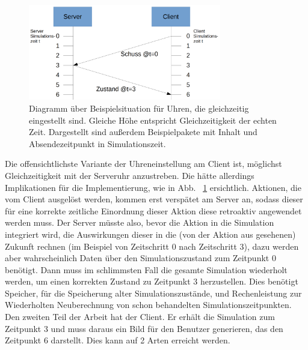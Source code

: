 \begin{figure}
    \centering
    \includegraphics[width=0.75\textwidth]{./Zeichnung1a.png}
    \caption{Diagramm über Beispielsituation für Uhren, die gleichzeitig eingestellt sind. Gleiche Höhe entspricht Gleichzeitigkeit der echten Zeit. Dargestellt sind außerdem Beispielpakete mit Inhalt und Absendezeitpunkt in Simulationszeit.}
    \label{fig:zeichnung1a}
\end{figure}
Die offensichtlichste Variante der Uhreneinstellung am Client ist, möglichst Gleichzeitigkeit mit der Serveruhr anzustreben. Die hätte allerdings Implikationen für die Implementierung, wie in Abb. ~\ref{fig:zeichnung1a} ersichtlich. Aktionen, die vom Client ausgelöst werden, kommen erst verspätet am Server an, sodass dieser für eine korrekte zeitliche Einordnung dieser Aktion diese retroaktiv angewendet werden muss. Der Server müsste also, bevor die Aktion in die Simulation integriert wird, die Auswirkungen dieser in die (von der Aktion aus gesehenen) Zukunft rechnen (im Beispiel von Zeitschritt 0 nach Zeitschritt 3), dazu werden aber wahrscheinlich Daten über den Simulationszustand zum Zeitpunkt 0 benötigt. Dann muss im schlimmsten Fall die gesamte Simulation wiederholt werden, um einen korrekten Zustand zu Zeitpunkt 3 herzustellen. Dies benötigt Speicher, für die Speicherung alter Simulationszustände, und Rechenleistung zur Wiederholten Neuberechnung von schon behandelten Simulationszeitpunkten. Den zweiten Teil der Arbeit hat der Client. Er erhält die Simulation zum Zeitpunkt 3 und muss daraus ein Bild für den Benutzer generieren, das den Zeitpunkt 6 darstellt. Dies kann auf 2 Arten erreicht werden.
